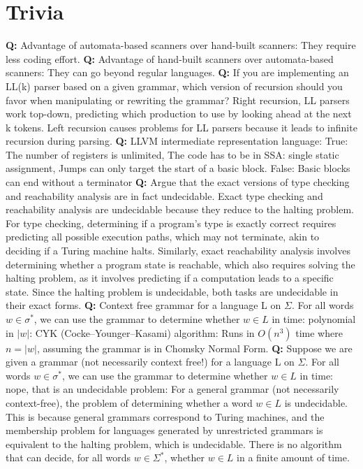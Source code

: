 
\section{Trivia}
\textbf{Q:} Advantage of automata-based scanners over hand-built scanners: They require less coding effort.
\textbf{Q:} Advantage of hand-built scanners over automata-based scanners: They can go beyond regular languages.
\textbf{Q:} If you are implementing an LL(k) parser based on a given grammar, which version of recursion should you favor when manipulating or rewriting the grammar? Right recursion, LL parsers work top-down, predicting which production to use by looking ahead at the next k tokens. Left recursion causes problems for LL parsers because it leads to infinite recursion during parsing.
\textbf{Q:} LLVM intermediate representation language: True: The number of registers is unlimited, The code has to be in SSA: single static assignment, Jumps can only target the start of a basic block. False: Basic blocks can end without a terminator
\textbf{Q:} Argue that the exact versions of type checking and reachability analysis are in fact undecidable. Exact type checking and reachability analysis are undecidable because they reduce to the halting problem. For type checking, determining if a program’s type is exactly correct requires predicting all possible execution paths, which may not terminate, akin to deciding if a Turing machine halts. Similarly, exact reachability analysis involves determining whether a program state is reachable, which also requires solving the halting problem, as it involves predicting if a computation leads to a specific state. Since the halting problem is undecidable, both tasks are undecidable in their exact forms.
\textbf{Q:} Context free grammar for a language L on $\Sigma$. For all words $w \in \sigma^*$, we can use the grammar to determine whether $w \in L$ in time: polynomial in $ \vert w \vert $: CYK (Cocke–Younger–Kasami) algorithm: Runs in $O(n^3)$ time where $n = \vert w \vert$, assuming the grammar is in Chomsky Normal Form.
\textbf{Q:} Suppose we are given a grammar (not necessarily context free!) for a language L on $\Sigma$. For all words $w \in \sigma^*$, we can use the grammar to determine whether $w \in L$ in time: nope, that is an undecidable problem: For a general grammar (not necessarily context-free), the problem of determining whether a word \( w \in L \) is undecidable. This is because general grammars correspond to Turing machines, and the membership problem for languages generated by unrestricted grammars is equivalent to the halting problem, which is undecidable. There is no algorithm that can decide, for all words \( w \in \Sigma^* \), whether \( w \in L \) in a finite amount of time.
